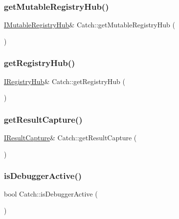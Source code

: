\subsubsection{\texorpdfstring{get\+Mutable\+Registry\+Hub()}{getMutableRegistryHub()}}
{\footnotesize\ttfamily \hyperlink{struct_catch_1_1_i_mutable_registry_hub}{I\+Mutable\+Registry\+Hub}\& Catch\+::get\+Mutable\+Registry\+Hub (\begin{DoxyParamCaption}{ }\end{DoxyParamCaption})}

\hypertarget{namespace_catch_ac24b072979540bfd922e7d46e899f46f}{}\label{namespace_catch_ac24b072979540bfd922e7d46e899f46f} 
\subsubsection{\texorpdfstring{get\+Registry\+Hub()}{getRegistryHub()}}
{\footnotesize\ttfamily \hyperlink{struct_catch_1_1_i_registry_hub}{I\+Registry\+Hub}\& Catch\+::get\+Registry\+Hub (\begin{DoxyParamCaption}{ }\end{DoxyParamCaption})}

\hypertarget{namespace_catch_aff60c1de6ac6cea30175d70e33d83c8e}{}\label{namespace_catch_aff60c1de6ac6cea30175d70e33d83c8e} 
\subsubsection{\texorpdfstring{get\+Result\+Capture()}{getResultCapture()}}
{\footnotesize\ttfamily \hyperlink{struct_catch_1_1_i_result_capture}{I\+Result\+Capture}\& Catch\+::get\+Result\+Capture (\begin{DoxyParamCaption}{ }\end{DoxyParamCaption})}

\hypertarget{namespace_catch_ab079497368fb1df25af39ad494d2a241}{}\label{namespace_catch_ab079497368fb1df25af39ad494d2a241} 
\subsubsection{\texorpdfstring{is\+Debugger\+Active()}{isDebuggerActive()}}
{\footnotesize\ttfamily bool Catch\+::is\+Debugger\+Active (\begin{DoxyParamCaption}{ }\end{DoxyParamCaption})}

